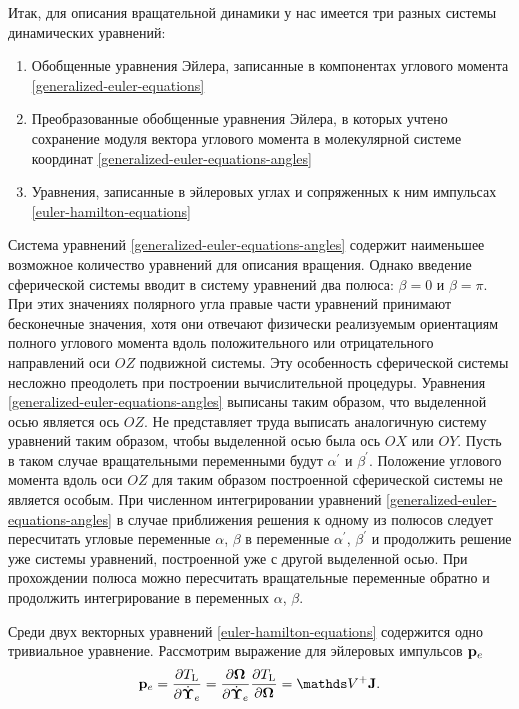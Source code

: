 Итак, для описания вращательной динамики у нас имеется три разных системы динамических уравнений:
\begin{enumerate}
    \item Обобщенные уравнения Эйлера, записанные в компонентах углового момента \eqref{generalized-euler-equations}
    \item Преобразованные обобщенные уравнения Эйлера, в которых учтено сохранение модуля вектора углового момента в молекулярной системе координат \eqref{generalized-euler-equations-angles}
    \item Уравнения, записанные в эйлеровых углах и сопряженных к ним импульсах \eqref{euler-hamilton-equations}
\end{enumerate}

Система уравнений \eqref{generalized-euler-equations-angles} содержит наименьшее возможное количество уравнений для описания вращения. Однако введение сферической системы вводит в систему уравнений два полюса: $\beta = 0$ и $\beta = \pi$. При этих значениях полярного угла правые части уравнений принимают бесконечные значения, хотя они отвечают физически реализуемым ориентациям полного углового момента вдоль положительного или отрицательного направлений оси $OZ$ подвижной системы. Эту особенность сферической системы несложно преодолеть при построении вычислительной процедуры. Уравнения \eqref{generalized-euler-equations-angles} выписаны таким образом, что выделенной осью является ось $OZ$. Не представляет труда выписать аналогичную систему уравнений таким образом, чтобы выделенной осью была ось $OX$ или $OY$. Пусть в таком случае вращательными переменными будут $\alpha^\prime$ и $\beta^\prime$. Положение углового момента вдоль оси $OZ$ для таким образом построенной сферической системы не является особым. При численном интегрировании уравнений \eqref{generalized-euler-equations-angles} в случае приближения решения к одному из полюсов следует пересчитать угловые переменные $\alpha$, $\beta$ в переменные $\alpha^\prime$, $\beta^\prime$ и продолжить решение уже системы уравнений, построенной уже с другой выделенной осью. При прохождении полюса можно пересчитать вращательные переменные обратно и продолжить интегрирование в переменных $\alpha$, $\beta$. \par
Среди двух векторных уравнений \eqref{euler-hamilton-equations} содержится одно тривиальное уравнение. Рассмотрим выражение для эйлеровых импульсов $\mathbf{p}_e$
\begin{gather}
    \pe = \frac{\partial \Tl}{\partial \dot{\boldsymbol{\Upsilon}}_e} = \frac{\partial \bOmega}{\partial \dot{\boldsymbol{\Upsilon}}_e} \frac{\partial \Tl}{\partial \bOmega} = \bbV^+ \mf{J}.
\end{gather}

